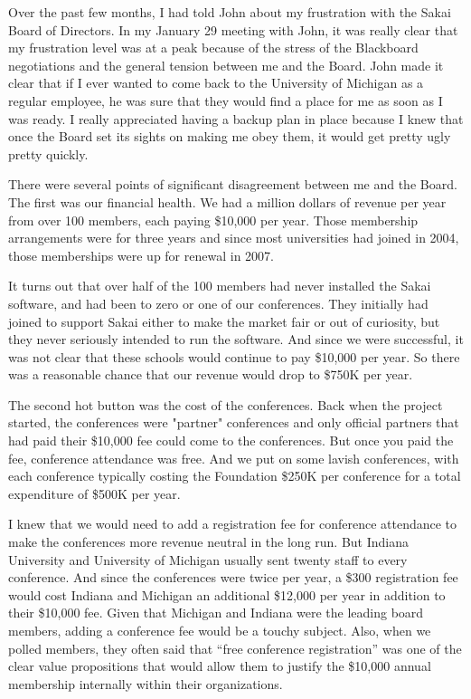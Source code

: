 \documentclass[12pt]{book}
\begin{document}

Over the past few months, I had told John about my frustration with the Sakai
Board of Directors.  In my January 29 meeting with John, it was really
clear that my frustration level was at a peak because of the stress of the Blackboard
negotiations and the general tension between me and the Board.  John made it
clear that if I ever wanted to come back to the University of Michigan as a
regular employee, he was sure that they would find a place for me as soon as I
was ready.   I really appreciated having a backup plan in place because
I knew that once the Board set its sights on making me obey them, it would get pretty
ugly pretty quickly.

There were several points of significant disagreement between me and the Board.
The first was our financial health.   We had a million dollars of revenue per year
from over 100 members, each paying \$10,000 per year.   Those membership
arrangements were for three years and since most universities had joined in 2004,
those memberships were up for renewal in 2007.

It turns out that over half of the 100 members had never installed the Sakai software,
and had been to zero or one of our conferences.   They initially had joined to support
Sakai either to make the market fair or out of curiosity, but they never
seriously intended to run the software.
And since we were successful, it was not clear that these schools would continue to
pay \$10,000 per year.   So there was a reasonable chance that our revenue would drop
to \$750K per year.

The second hot button was the cost of the conferences.   Back when the project started,
the conferences were "partner" conferences and only official partners that had paid their
\$10,000 fee could come to the conferences.   But once you paid the fee, conference
attendance was free.  And we put on some lavish conferences, with each conference
typically costing the Foundation \$250K per conference for a total expenditure of
\$500K per year.

I knew that we would need to add a registration fee for conference attendance to make
the conferences more revenue neutral in the long run.  But Indiana University and
University of Michigan usually sent twenty staff to every conference.   And since the
conferences were twice per year, a \$300 registration fee would cost Indiana and Michigan
an additional \$12,000 per year in addition to their \$10,000 fee.   Given that
Michigan and Indiana were the leading board members, adding a conference fee
would be a touchy subject.   Also, when we polled members, they often said that
``free conference registration'' was one of the clear value propositions that would
allow them to justify the \$10,000 annual membership internally within their
organizations.
\end{document}

